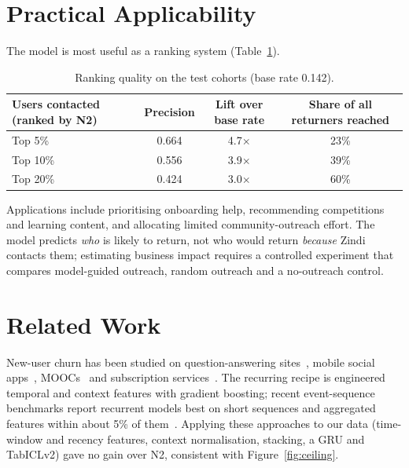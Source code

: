 \documentclass[11pt,a4paper]{article}
\begin{document}
\section{Practical Applicability}
The model is most useful as a ranking system (Table~\ref{tab:lift}).
\begin{table}[H]
\centering\small
\begin{tabular}{lccc}
\toprule
Users contacted (ranked by N2) & Precision & Lift over base rate & Share of all returners reached\\
\midrule
Top 5\% & 0.664 & 4.7$\times$ & 23\%\\
Top 10\% & 0.556 & 3.9$\times$ & 39\%\\
Top 20\% & 0.424 & 3.0$\times$ & 60\%\\
\bottomrule
\end{tabular}
\caption{Ranking quality on the test cohorts (base rate 0.142).}
\label{tab:lift}
\end{table}
Applications include prioritising onboarding help, recommending competitions and learning content, and
allocating limited community-outreach effort. The model predicts \emph{who} is likely to return, not who would
return \emph{because} Zindi contacts them; estimating business impact requires a controlled experiment that
compares model-guided outreach, random outreach and a no-outreach control.

\section{Related Work}
New-user churn has been studied on question-answering sites~\citep{dror2012churn}, mobile social
apps~\citep{yang2018clus}, MOOCs~\citep{feng2019dropout} and subscription services~\citep{gregory2018churn}. The
recurring recipe is engineered temporal and context features with gradient boosting; recent event-sequence
benchmarks report recurrent models best on short sequences and aggregated features within about 5\% of
them~\citep{osin2025ebes}. Applying these approaches to our data (time-window and recency features, context
normalisation, stacking, a GRU and TabICLv2) gave no gain over N2, consistent with Figure~\ref{fig:ceiling}.
\end{document}
